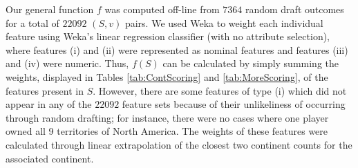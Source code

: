 \documentclass[letterpaper]{article}
\numberwithin{equation}{section}
\numberwithin{theorem}{section}
\numberwithin{lemma}{section}
\numberwithin{df}{section}
\begin{document}
Our general function $f$ was computed off-line from $7364$ random draft outcomes for a total of $22092$ $(S,v)$ pairs.  We used Weka \cite{Weka} to weight each individual feature using Weka's linear regression classifier (with no attribute selection), where features (i) and (ii) were represented as nominal features and features (iii) and (iv) were numeric.  Thus, $f(S)$ can be calculated by simply summing the weights, displayed in Tables \ref{tab:ContScoring} and \ref{tab:MoreScoring}, of the features present in $S$.  However, there are some features of type (i) which did not appear in any of the $22092$ feature sets because of their unlikeliness of occurring through random drafting; for instance, there were no cases where one player owned all 9 territories of North America.  The weights of these features were calculated through linear extrapolation of the closest two continent counts for the associated continent.    %
\end{document}
